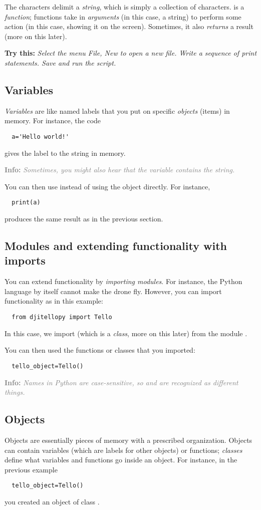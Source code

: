\documentclass[12pt]{article}
\newcommand{\textsfbf}[1]{\textsf{\textbf{#1}}}
\newcommand{\info}[1]{\par\textcolor{gray}{\textsfbf{Info:} \emph{#1}}}
\newcommand{\trythis}[1]{\par\textcolor{DodgerBlue4}{\textsfbf{Try this:} \emph{#1}}}
\begin{document}
The  characters delimit a \emph{string}, which is simply a collection of characters.  is a \emph{function}; functions take in \emph{arguments} (in this case, a string) to perform some action (in this case, showing it on the screen). Sometimes, it also \emph{returns} a result (more on this later).

\trythis{Select the menu \emph{File}, \emph{New} to open a new file. Write a sequence of print statements. Save and run the script.}

\subsection{Variables}
\emph{Variables} are like named labels that you put on specific \emph{objects} (items) in memory. For instance, the code
\begin{lstlisting}
  a='Hello world!'
\end{lstlisting}
gives the label  to the string  in memory. \info{Sometimes, you might also hear that the variable \var{a} \emph{contains} the string.}

You can then use  instead of using the object directly. For instance,
\begin{lstlisting}
  print(a)
\end{lstlisting}
produces the same result as in the previous section.

\subsection{Modules and extending functionality with imports}
You can extend functionality by \emph{importing modules}. For instance, the Python language by itself cannot make the drone fly. However, you can import functionality as in this example:
\begin{lstlisting}
  from djitellopy import Tello
\end{lstlisting}
In this case, we import  (which is a \emph{class}, more on this later) from the module .

You can then used the functions or classes that you imported:
\begin{lstlisting}
  tello_object=Tello()
\end{lstlisting}

\info{Names in Python are case-sensitive, so  and \var{Tello} are recognized as different things.}

\subsection{Objects}
Objects are essentially pieces of memory with a prescribed organization. Objects can contain variables (which are labels for other objects) or functions; \emph{classes} define what variables and functions go inside an object. For instance, in the previous example
\begin{lstlisting}
  tello_object=Tello()
\end{lstlisting}
you created an object  of class .
\end{document}
